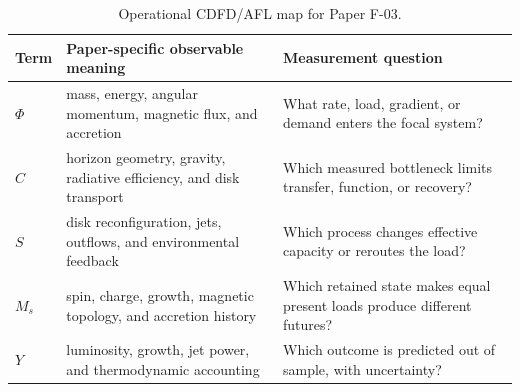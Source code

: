 \documentclass[11pt,a4paper]{article}
\begin{document}
\begin{table}[htbp]
\centering
\small
\caption{Operational CDFD/AFL map for Paper F-03.}
\begin{tabularx}{\textwidth}{|l|X|X|}
\hline
\textbf{Term} & \textbf{Paper-specific observable meaning} & \textbf{Measurement question} \\
\hline
$\Phi$ & mass, energy, angular momentum, magnetic flux, and accretion & What rate, load, gradient, or demand enters the focal system? \\
\hline
$C$ & horizon geometry, gravity, radiative efficiency, and disk transport & Which measured bottleneck limits transfer, function, or recovery? \\
\hline
$S$ & disk reconfiguration, jets, outflows, and environmental feedback & Which process changes effective capacity or reroutes the load? \\
\hline
$M_s$ & spin, charge, growth, magnetic topology, and accretion history & Which retained state makes equal present loads produce different futures? \\
\hline
$Y$ & luminosity, growth, jet power, and thermodynamic accounting & Which outcome is predicted out of sample, with uncertainty? \\
\hline
\end{tabularx}
\end{table}
\end{document}
